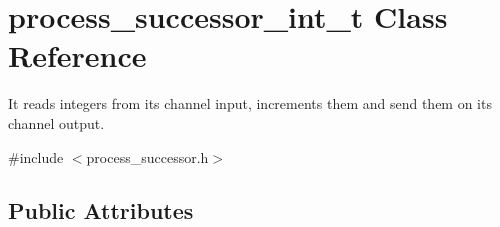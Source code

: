 \hypertarget{structprocess__successor__int__t}{\section{process\-\_\-successor\-\_\-int\-\_\-t Class Reference}
\label{structprocess__successor__int__t}
}


It reads integers from its channel input, increments them and send them on its channel output.  




{\ttfamily \#include $<$process\-\_\-successor.\-h$>$}

\subsection*{Public Attributes}
